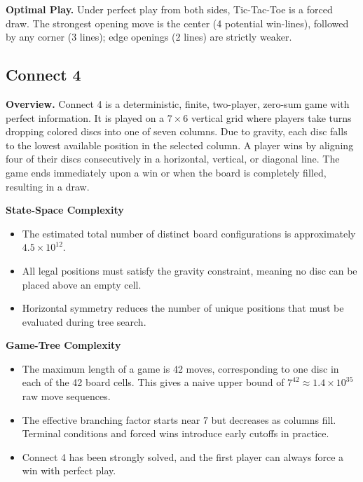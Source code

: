 \documentclass[12pt]{article}
\begin{document}
\vspace{1em}

\noindent\textbf{Optimal Play.}  
Under perfect play from both sides, Tic-Tac-Toe is a forced draw. The strongest opening move is the center (4 potential win-lines), followed by any corner (3 lines); edge openings (2 lines) are strictly weaker.

\subsection{Connect 4}

\textbf{Overview.}  
Connect 4 is a deterministic, finite, two-player, zero-sum game with perfect information. It is played on a $7\times6$ vertical grid where players take turns dropping colored discs into one of seven columns. Due to gravity, each disc falls to the lowest available position in the selected column. A player wins by aligning four of their discs consecutively in a horizontal, vertical, or diagonal line. The game ends immediately upon a win or when the board is completely filled, resulting in a draw.

\vspace{1em}

\noindent\textbf{State-Space Complexity}
\begin{itemize}
  \item The estimated total number of distinct board configurations is approximately $4.5 \times 10^{12}$.
  \item All legal positions must satisfy the gravity constraint, meaning no disc can be placed above an empty cell.
  \item Horizontal symmetry reduces the number of unique positions that must be evaluated during tree search.
\end{itemize}

\noindent\textbf{Game-Tree Complexity}
\begin{itemize}
  \item The maximum length of a game is 42 moves, corresponding to one disc in each of the 42 board cells. This gives a naive upper bound of $7^{42} \approx 1.4 \times 10^{35}$ raw move sequences.
  \item The effective branching factor starts near 7 but decreases as columns fill. Terminal conditions and forced wins introduce early cutoffs in practice.
  \item Connect 4 has been strongly solved, and the first player can always force a win with perfect play.
\end{itemize}
\end{document}
